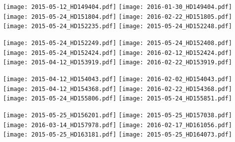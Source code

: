 \documentclass[a4paper]{aa}
\begin{document}
\noindent
  \texttt{[image: 2015-05-12\_HD149404.pdf]}
  \texttt{[image: 2016-01-30\_HD149404.pdf]}\\
  \texttt{[image: 2015-05-24\_HD151804.pdf]}
  \texttt{[image: 2016-02-22\_HD151805.pdf]}\\
  \texttt{[image: 2015-05-24\_HD152235.pdf]}
  \texttt{[image: 2015-05-24\_HD152248.pdf]}

\newpage
\noindent
  \texttt{[image: 2015-05-24\_HD152249.pdf]}
  \texttt{[image: 2015-05-24\_HD152408.pdf]}\\
  \texttt{[image: 2015-05-24\_HD152424.pdf]}
  \texttt{[image: 2016-02-12\_HD152424.pdf]}\\
  \texttt{[image: 2015-04-12\_HD153919.pdf]}
  \texttt{[image: 2016-02-22\_HD153919.pdf]}

\newpage
\noindent
  \texttt{[image: 2015-04-12\_HD154043.pdf]}
  \texttt{[image: 2016-02-02\_HD154043.pdf]}\\
  \texttt{[image: 2015-04-12\_HD154368.pdf]}
  \texttt{[image: 2016-02-22\_HD154368.pdf]}\\
  \texttt{[image: 2015-05-24\_HD155806.pdf]}
  \texttt{[image: 2015-05-24\_HD155851.pdf]}

\newpage
\noindent
  \texttt{[image: 2015-05-25\_HD156201.pdf]}
  \texttt{[image: 2015-05-25\_HD157038.pdf]}\\
  \texttt{[image: 2016-03-14\_HD157978.pdf]}
  \texttt{[image: 2016-02-17\_HD161056.pdf]}\\
  \texttt{[image: 2015-05-25\_HD163181.pdf]}
  \texttt{[image: 2015-05-25\_HD164073.pdf]}
\end{document}
